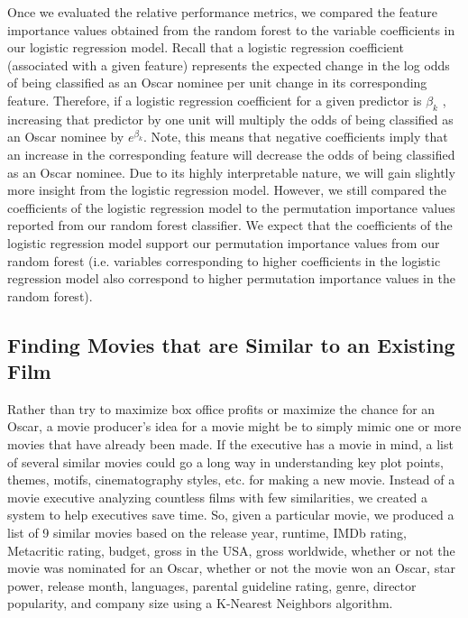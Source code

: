 \documentclass[10pt]{article}
\begin{document}
Once we evaluated the relative performance metrics, we compared the feature importance values obtained from the random forest to the variable coefficients in our logistic regression model. Recall that a logistic regression coefficient (associated with a given feature) represents the expected change in the log odds of being classified as an Oscar nominee per unit change in its corresponding feature. Therefore, if a logistic regression coefficient for a given predictor is $\beta_k$ , increasing that predictor by one unit will multiply the odds of being classified as an Oscar nominee by $e^{\beta_k}$. Note, this means that negative coefficients imply that an increase in the corresponding feature will decrease the odds of being classified as an Oscar nominee. Due to its highly interpretable nature, we will gain slightly more insight from the logistic regression model. However, we still compared the coefficients of the logistic regression model to the permutation importance values reported from our random forest classifier. We expect that the coefficients of the logistic regression model support our permutation importance values from our random forest (i.e. variables corresponding to higher coefficients in the logistic regression model also correspond to higher permutation importance values in the random forest).  

\subsection{Finding Movies that are Similar to an Existing Film}

Rather than try to maximize box office profits or maximize the chance for an Oscar, a movie producer’s idea for a movie might be to simply mimic one or more movies that have already been made. If the executive has a movie in mind, a list of several similar movies could go a long way in understanding key plot points, themes, motifs, cinematography styles, etc. for making a new movie. Instead of a movie executive analyzing countless films with few similarities, we created a system to help executives save time. So, given a particular movie, we produced a list of 9 similar movies based on the release year, runtime, IMDb rating, Metacritic rating, budget, gross in the USA, gross worldwide, whether or not the movie was nominated for an Oscar, whether or not the movie won an Oscar, star power, release month, languages, parental guideline rating, genre, director popularity, and company size using a K-Nearest Neighbors algorithm.
\end{document}
